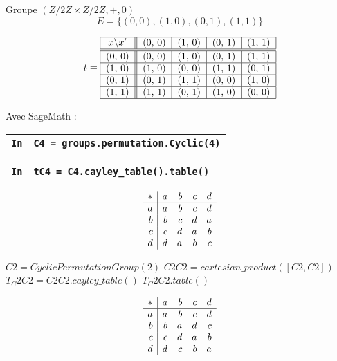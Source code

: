 \documentclass[titlepage]{article}
\begin{document}
        Groupe $(Z/2Z \times Z/2Z, +, 0)$
        \[E = \{(0, 0), (1, 0), (0, 1), (1, 1)\}\]
  
        \[t=\begin{tabular}{| c || c | c | c | c |}
            \hline
            $x$\textbackslash $x'$ & (0, 0) & (1, 0) & (0, 1) & (1, 1) \\ \hline \hline
            (0, 0) & (0, 0) & (1, 0) & (0, 1) & (1, 1) \\ \hline
            (1, 0) & (1, 0) & (0, 0) & (1, 1) & (0, 1) \\ \hline
            (0, 1) & (0, 1) & (1, 1) & (0, 0) & (1, 0) \\ \hline
            (1, 1) & (1, 1) & (0, 1) & (1, 0) & (0, 0) \\
            \hline
        \end{tabular}\]

        Avec SageMath :

        \begin{tabularx}{11.5cm}{|p{0.60cm}|X|}
            \hline
            \verb|In|
            & 
            \verb|C4 = groups.permutation.Cyclic(4)|
            \\
            \hline
        \end{tabularx}
            
        \begin{tabularx}{11.5cm}{|p{0.60cm}|X|}
            \hline
            \verb|In|
            & 
            \verb|tC4 = C4.cayley_table().table()|
            \\
            \hline
        \end{tabularx}

        {\setlength{\arraycolsep}{2ex}
        \[\begin{array}{r|*{4}{r}}
            \multicolumn{1}{c|}{\ast}&a&b&c&d\\\hline
            {}a&a&b&c&d\\
            {}b&b&c&d&a\\
            {}c&c&d&a&b\\
            {}d&d&a&b&c\\
        \end{array}\]}

        $C2 = CyclicPermutationGroup(2)$
        $C2C2 = cartesian\_product([C2, C2])$
        $T_C2C2 = C2C2.cayley\_table()$
        $T_C2C2.table()$

        {\setlength{\arraycolsep}{2ex}
        \[\begin{array}{r|*{4}{r}}
            \multicolumn{1}{c|}{\ast}&a&b&c&d\\\hline
            {}a&a&b&c&d\\
            {}b&b&a&d&c\\
            {}c&c&d&a&b\\
            {}d&d&c&b&a\\
        \end{array}\]}
\end{document}
